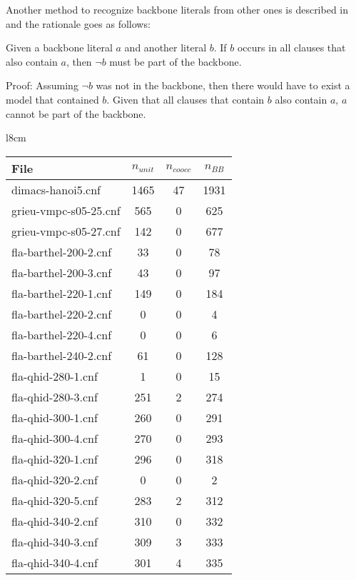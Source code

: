 Another method to recognize backbone literals from other ones is described in \cite{wbxcl16} and the rationale goes as follows:

\begin{lemma}
Given a backbone literal $a$ and another literal $b$. If $b$ occurs in all clauses that also contain $a$, then $\neg b$ must be part of the backbone. 

Proof: Assuming $\neg b$ was not in the backbone, then there would have to exist a model that contained $b$. Given that all clauses that contain $b$ also contain $a$, $a$ cannot be part of the backbone.
\end{lemma}
\begin{wraptable}[31]{l}{8cm}
\begin{tabular}{l| c c c }
File& $n_{unit}$ & $n_{coocc}$ & $n_{BB}$\\
\hline
dimacs-hanoi5.cnf & 1465 & 47 & 1931 \\
grieu-vmpc-s05-25.cnf & 565 & 0 & 625 \\
grieu-vmpc-s05-27.cnf & 142 & 0 & 677 \\
fla-barthel-200-2.cnf & 33 & 0 & 78 \\
fla-barthel-200-3.cnf & 43 & 0 & 97 \\
fla-barthel-220-1.cnf & 149 & 0 & 184 \\
fla-barthel-220-2.cnf & 0 & 0 & 4 \\
fla-barthel-220-4.cnf & 0 & 0 & 6 \\
fla-barthel-240-2.cnf & 61 & 0 & 128 \\
fla-qhid-280-1.cnf & 1 & 0 & 15 \\
fla-qhid-280-3.cnf & 251 & 2 & 274 \\
fla-qhid-300-1.cnf & 260 & 0 & 291 \\
fla-qhid-300-4.cnf & 270 & 0 & 293 \\
fla-qhid-320-1.cnf & 296 & 0 & 318 \\
fla-qhid-320-2.cnf & 0 & 0 & 2 \\
fla-qhid-320-5.cnf & 283 & 2 & 312 \\
fla-qhid-340-2.cnf & 310 & 0 & 332 \\
fla-qhid-340-3.cnf & 309 & 3 & 333 \\
fla-qhid-340-4.cnf & 301 & 4 & 335 \\

\end{tabular}
\end{wraptable}

